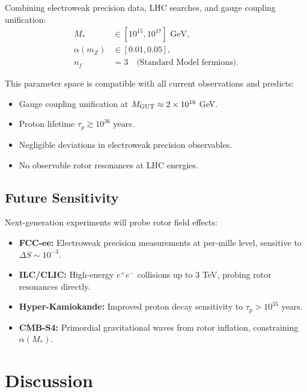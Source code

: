 \documentclass[11pt,a4paper]{article}
\numberwithin{equation}{section}
\theoremstyle{plain}
\theoremstyle{definition}
\theoremstyle{remark}
\begin{document}
Combining electroweak precision data, LHC searches, and gauge coupling unification:
\begin{align}
M_* &\in [10^{15}, 10^{17}]\text{ GeV}, \label{eq:M-star-allowed}\\
\alpha(m_Z) &\in [0.01, 0.05], \label{eq:alpha-allowed}\\
n_f &= 3 \quad\text{(Standard Model fermions)}.
\label{eq:nf-allowed}
\end{align}

This parameter space is compatible with all current observations and predicts:
\begin{itemize}
  \item Gauge coupling unification at $M_{\rm GUT}\approx 2\times 10^{16}$ GeV.
  \item Proton lifetime $\tau_p \gtrsim 10^{36}$ years.
  \item Negligible deviations in electroweak precision observables.
  \item No observable rotor resonances at LHC energies.
\end{itemize}

\subsection{Future Sensitivity}

Next-generation experiments will probe rotor field effects:
\begin{itemize}
  \item \textbf{FCC-ee:} Electroweak precision measurements at per-mille level, sensitive to $\Delta S\sim 10^{-3}$.
  \item \textbf{ILC/CLIC:} High-energy $e^+e^-$ collisions up to 3 TeV, probing rotor resonances directly.
  \item \textbf{Hyper-Kamiokande:} Improved proton decay sensitivity to $\tau_p > 10^{35}$ years.
  \item \textbf{CMB-S4:} Primordial gravitational waves from rotor inflation, constraining $\alpha(M_*)$.
\end{itemize}

\vspace{1em}

\section{Discussion}\label{sec:discussion}
\end{document}
